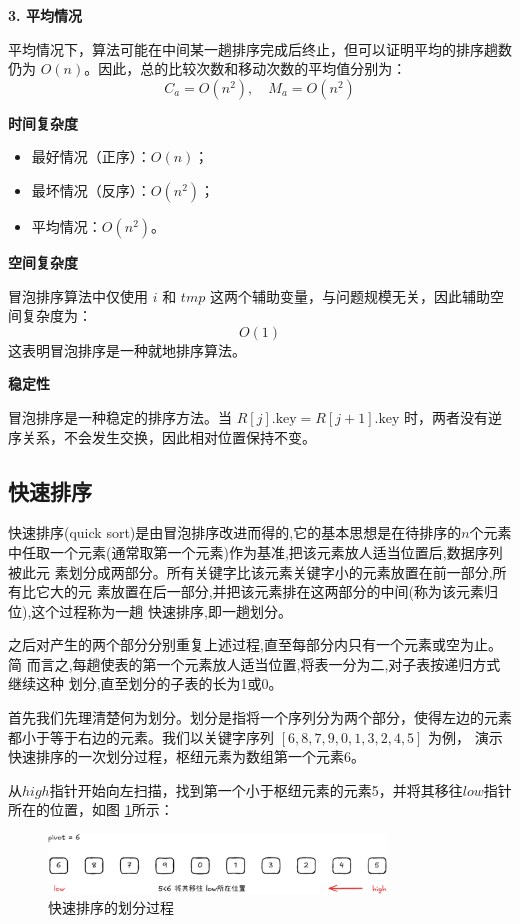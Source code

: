\documentclass[lang=cn,newtx,10pt,scheme=chinese]{../elegantbook}
\begin{document}
  \textbf{3. 平均情况  }

   平均情况下，算法可能在中间某一趟排序完成后终止，但可以证明平均的排序趟数仍为 $O(n)$。因此，总的比较次数和移动次数的平均值分别为：
   \[
   C_a = O(n^2), \quad M_a = O(n^2)
   \]

\textbf{时间复杂度 }

\begin{itemize}
  \item 最好情况（正序）：$O(n)$；
  \item 最坏情况（反序）：$O(n^2)$；
  \item 平均情况：$O(n^2)$。
\end{itemize}

\textbf{空间复杂度 } 

冒泡排序算法中仅使用 $i$ 和 $tmp$ 这两个辅助变量，与问题规模无关，因此辅助空间复杂度为：
\[
O(1)
\]
这表明冒泡排序是一种就地排序算法。

\textbf{稳定性 }  

冒泡排序是一种稳定的排序方法。当 $R[j].\text{key} = R[j+1].\text{key}$ 时，两者没有逆序关系，不会发生交换，因此相对位置保持不变。


\subsection{快速排序}

 

快速排序(quick sort)是由冒泡排序改进而得的,它的基本思想是在待排序的$n$个元素
中任取一个元素(通常取第一个元素)作为基准,把该元素放人适当位置后,数据序列被此元
素划分成两部分。所有关键字比该元素关键字小的元素放置在前一部分,所有比它大的元
素放置在后一部分,并把该元素排在这两部分的中间(称为该元素归位),这个过程称为一趟
快速排序,即一趟划分。

之后对产生的两个部分分别重复上述过程,直至每部分内只有一个元素或空为止。简
而言之,每趟使表的第一个元素放人适当位置,将表一分为二,对子表按递归方式继续这种
划分,直至划分的子表的长为1或0。

首先我们先理清楚何为划分。划分是指将一个序列分为两个部分，使得左边的元素都小于等于右边的元素。我们以关键字序列 $[6,8,7,9,0,1,3,2,4,5]$ 为例，
演示快速排序的一次划分过程，枢纽元素为数组第一个元素6。

从$high$指针开始向左扫描，找到第一个小于枢纽元素的元素5，并将其移往$low$指针所在的位置，如图 \ref{fig:patition_a}所示：

\begin{figure}[!htbp]
    \centering
    \includegraphics[width=0.8\textwidth]{./figure/pdf/cropped/patition_a.pdf}
    \caption{快速排序的划分过程}
    \label{fig:patition_a}

\end{figure}
\end{document}

